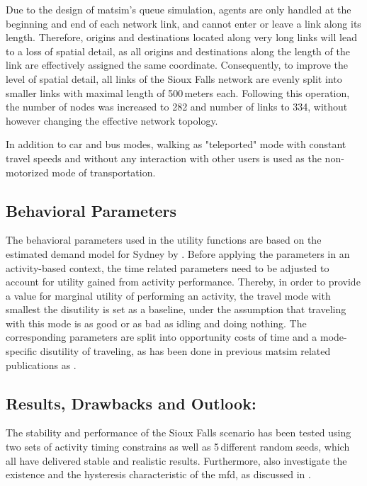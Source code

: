 Due to the design of \gls{matsim}’s queue simulation, agents are only handled at the beginning and end of each network link, and cannot enter or leave a link along its length. Therefore, origins and destinations located along very long links will lead to a loss of spatial detail, as all origins and destinations along the length of the link are effectively assigned the same coordinate. Consequently, to improve the level of spatial detail, all links of the Sioux Falls network are evenly split into smaller links with maximal length of 500\,meters each. Following this operation, the number of nodes was increased to 282 and number of links to 334, without however changing the effective network topology.

In addition to car and bus modes, walking as "teleported" mode with constant travel speeds and without any interaction with other users is used as the non-motorized mode of transportation. 

\subsection{Behavioral Parameters}
The behavioral parameters used in the utility functions are based on the estimated demand model for Sydney by \citet[][]{TirachiniHensherRose_TransResB_2014}. Before applying the parameters in an activity-based context, the time related parameters need to be adjusted to account for utility gained from activity performance. Thereby, in order to provide a value for marginal utility of performing an activity, the travel mode with smallest the disutility is set as a baseline, under the assumption that traveling with this mode is as good or as bad as idling and doing nothing. The corresponding parameters are split into opportunity costs of time and a mode-specific disutility of traveling, as has been done in previous \gls{matsim} related publications as \citet[e.g,][]{KickhoeferEtAl_Transportation_2011}. 

\subsection{Results, Drawbacks and Outlook:}
The stability and performance of the Sioux Falls scenario has been tested using two sets of activity timing constrains as well as 5\,different random seeds, which all have delivered stable and realistic results. Furthermore, \citet[][]{ChakirovFourie_TechRep_FCL_2014} also investigate the existence and the hysteresis characteristic of the \gls{mfd}, as discussed in \citet[][]{GeroliminisDaganzo_TRB_2007, GeroliminisDaganzo_TransResB_2008, GeroliminisSun_TransResA_2011}. 

